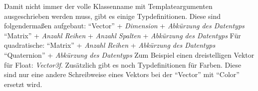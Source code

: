 Damit nicht immer der volle Klassenname mit Templateargumenten ausgeschrieben werden muss, gibt es einige Typdefinitionen. Diese sind folgendermaßen aufgebaut:
\newline"`Vector"' + \textit{Dimension} + \textit{Abkürzung des Datentyps}
\newline"`Matrix"' + \textit{Anzahl Reihen} + \textit{Anzahl Spalten} + \textit{Abkürzung des Datentyps}
\newline Für quadratische: "`Matrix"' + \textit{Anzahl Reihen} + \textit{Abkürzung des Datentyps}
\newline"`Quaternion"' + \textit{Abkürzung des Datentyps}
\newline Zum Beispiel einen dreistelligen Vektor für Float: 
\newline\textit{Vector3f}.
Zusätzlich gibt es noch Typdefinitionen für Farben. Diese sind nur eine andere Schreibweise eines Vektors bei der "`Vector"' mit "`Color"' ersetzt wird.
